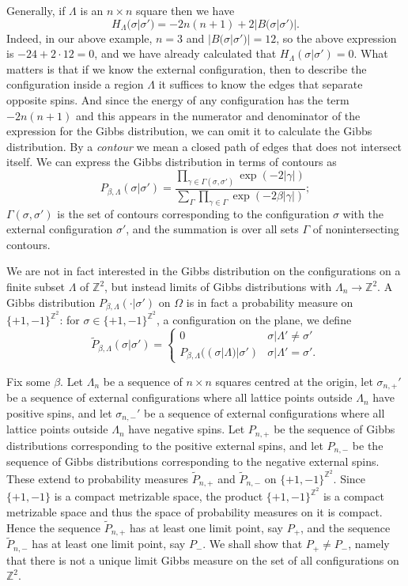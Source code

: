 \documentclass{article}
\begin{document}
Generally, if $\Lambda$ is an $n \times n$ square then we have
\[
H_\Lambda(\sigma|\sigma')=-2n(n+1)+2|B(\sigma|\sigma')|.
\]
Indeed, in our above example, $n=3$ and $|B(\sigma|\sigma')|=12$, so the above expression is $-24+2\cdot 12=0$, and we have already calculated that $H_\Lambda(\sigma|\sigma')=0$. What matters is that if we know the external configuration, then to describe the configuration inside a region $\Lambda$ it suffices to know the edges that separate opposite spins. And since the energy of any configuration has the term $-2n(n+1)$ and this appears in the numerator and denominator of the expression for the Gibbs distribution, we can omit it to calculate the Gibbs distribution. By a {\em contour} we mean a closed path of edges that does not intersect itself. We can express the Gibbs distribution in terms of contours as
\[
P_{\beta,\Lambda}(\sigma|\sigma')=\frac{\prod_{\gamma \in \Gamma(\sigma,\sigma')} \exp(-2|\gamma|)}{\sum_{\Gamma} \prod_{\gamma \in \Gamma} \exp(-2\beta|\gamma|)};
\]
$\Gamma(\sigma,\sigma')$ is the set of contours corresponding to the configuration $\sigma$ with the external configuration $\sigma'$, and the summation is over all sets $\Gamma$ of nonintersecting contours. 

We are not in fact interested in the Gibbs distribution on the configurations on a finite subset $\Lambda$ of $\mathbb{Z}^2$, but instead limits of Gibbs distributions with
$\Lambda_n \to \mathbb{Z}^2$. A Gibbs distribution $P_{\beta,\Lambda}(\cdot|\sigma')$ on $\Omega$ is in fact a probability measure on $\{+1,-1\}^{\mathbb{Z}^2}$: for $\sigma \in
\{+1,-1\}^{\mathbb{Z}^2}$, a configuration on the plane, we define
\[
\widetilde{P}_{\beta,\Lambda}(\sigma|\sigma')=\begin{cases}
0&\sigma|\Lambda' \neq \sigma'\\
P_{\beta,\Lambda}((\sigma|\Lambda) |\sigma')&\sigma|\Lambda'=\sigma'.
\end{cases}
\]

Fix some $\beta$.
Let $\Lambda_n$ be a sequence of $n \times n$ squares centred at the origin, let $\sigma_{n,+}'$ be a sequence of external configurations where all lattice points outside $\Lambda_n$
have positive spins, and let $\sigma_{n,-}'$ be a sequence of external configurations where all lattice points outside $\Lambda_n$ have negative spins.
Let $P_{n,+}$ be the sequence of Gibbs distributions corresponding to the positive external spins, and let $P_{n,-}$ be the sequence of Gibbs distributions corresponding to the negative external spins. These extend to probability measures $\widetilde{P}_{n,+}$ and $\widetilde{P}_{n,-}$ on $\{+1,-1\}^{\mathbb{Z}^2}$. Since $\{+1,-1\}$ is a compact metrizable space, the product $\{+1,-1\}^{\mathbb{Z}^2}$ is a compact metrizable space and thus the space of probability measures on it is compact. Hence the sequence $\widetilde{P}_{n,+}$
has at least one limit point, say $P_{+}$, and the sequence $\widetilde{P}_{n,-}$ has at least one limit point, say $P_{-}$. We shall show that $P_+ \neq P_-$, namely that there is not a unique limit Gibbs measure on the set of all configurations on $\mathbb{Z}^2$.
\end{document}
